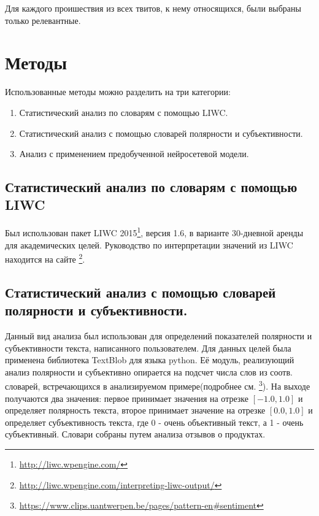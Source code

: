 \documentclass[11pt]{article}
\begin{document}
Для каждого проишествия из всех твитов, к нему относящихся, были выбраны только релевантные.

\section{Методы}
Использованные методы можно разделить на три категории:
\begin{enumerate}
    \item Статистический анализ по словарям с помощью LIWC.
    \item Статистический анализ с помощью словарей полярности и субъективности.
    \item Анализ с применением предобученной нейросетевой модели.
\end{enumerate}

\subsection{Статистический анализ по словарям с помощью LIWC}
Был использован пакет LIWC 2015\footnote{\url{http://liwc.wpengine.com/}}, версия 1.6, в варианте 30-дневной аренды для академических целей. Руководство по интерпретации значений из LIWC находится на сайте \footnote{\url{http://liwc.wpengine.com/interpreting-liwc-output/}}.

\subsection{Статистический анализ с помощью словарей полярности и субъективности.}
Данный вид анализа был использован для определений показателей полярности и субъективности текста, написанного пользователем. Для данных целей была применена библиотека TextBlob для языка python. Её модуль, реализующий анализ полярности и субъективно опирается на подсчет числа слов из соотв. словарей, встречающихся в анализируемом примере(подробнее см. \footnote{\url{https://www.clips.uantwerpen.be/pages/pattern-en#sentiment}}). На выходе получаются два значения: первое принимает значения на отрезке $[-1.0, 1.0]$ и определяет полярность текста, второе принимает значение на отрезке $[0.0, 1.0]$ и определяет субъективность текста, где 0 - очень объективный текст, а 1 - очень субъективный. Словари собраны путем анализа отзывов о продуктах.
\end{document}
